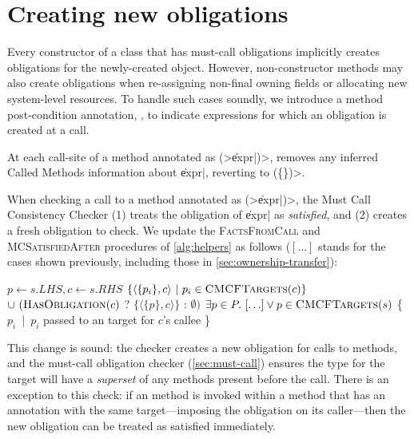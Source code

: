 \section{Creating new obligations}
\label{sec:reset-must-call}



Every constructor of a class that has must-call obligations
implicitly creates obligations for the newly-created object.
However, non-constructor methods may also create obligations
when re-assigning non-final owning fields or allocating
new system-level resources.
To handle such cases soundly, we introduce a method post-condition annotation,
\CreatesMustCallFor,
to indicate expressions for which an obligation is created at a call.

At each call-site of a method annotated as \CreatesMustCallFor\<(>\|expr|\<)>, \tool removes any
inferred Called Methods information about \|expr|, reverting to
\CalledMethods\<(\{\})>.

When checking a call to a method annotated as
\CreatesMustCallFor\<(>\|expr|\<)>, the Must Call Consistency Checker
(1) treats the \MustCall
obligation of \|expr| as \emph{satisfied},
and (2) creates a fresh obligation to check.
%
We update the \textsc{FactsFromCall} and \textsc{MCSatisfiedAfter} procedures of
\cref{alg:helpers} as follows ($[\ldots]$ stands for the cases shown previously,
including those in \cref{sec:ownership-transfer}):
\begin{algorithmic}
  \State $p \gets s.LHS, c \gets s.RHS$
  \State \Return $\{ \langle \{ p_i \}, c \rangle\ |\ p_i \in \textsc{CMCFTargets}(c) \}$ \newline
  \hspace*{5em} $\cup\ (\textsc{HasObligation}(c)$ ? $\{ \langle \{ p \}, c \rangle \}$ : $\emptyset)$
  \EndProcedure
  \State \Return $\exists p \in P .\ [\ldots] \vee p \in \textsc{CMCFTargets}(s)$
  \EndProcedure
  \State \Return \{ $p_i$\ |\ $p_i$ passed to an \CreatesMustCallFor target for $c$'s callee \}
  \EndProcedure
\end{algorithmic}
\noindent
This change is sound: the checker creates a new obligation for calls to
\CreatesMustCallFor methods, and the must-call obligation checker (\cref{sec:must-call}) ensures the
\MustCall type for the target will have a \emph{superset} of any methods present
before the call.
There is an exception to this check: if an \CreatesMustCallFor
method is invoked within a method that has an \CreatesMustCallFor annotation
with the same target---imposing the obligation on its caller---then
the new obligation can be treated as satisfied immediately.

